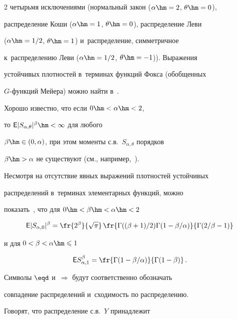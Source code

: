 \begin{multicols}{2}
четырьмя исключениями (нормальный закон ($\alpha\hm=2$, $\theta\hm=0$),


распределение Коши ($\alpha\hm=1$, $\theta\hm=0$), распределение Леви


($\alpha\hm=1/2$, $\theta\hm=1$) и~распределение, симметричное 


к~распределению Леви ($\alpha\hm=1/2$, $\theta\hm=-1$)). Выражения


устойчивых плотностей в~терминах функций Фокса (обобщенных


$G$-функ\-ций Мейера) можно найти в~\cite{Schneider1986, UchaikinZolotarev1999}.





Хорошо известно, что если $0\hm<\alpha\hm<2$, 


то ${\sf E}|S_{\alpha,\theta}|^{\beta}\hm<\infty$ для любого


$\beta\hm\in(0,\alpha)$, при этом моменты с.в.~$S_{\alpha,\theta}$ порядков


$\beta\hm>\alpha$ не существуют (см., например,~\cite{Zolotarev1983}).


Несмотря на отсутствие явных выражений плотностей устойчивых


распределений в~терминах элементарных функций, можно 


показать~\cite{KorolevWeibull2016}, что для $0\hm<\beta\hm<\alpha\hm<2$


$$


{\sf E}|S_{\alpha,0}|^{\beta}=\fr{2^{\beta}}{\sqrt{\pi}}\,


\fr{\Gamma(({\beta+1})/{2})\Gamma(1-{\beta}/{\alpha})}


{\Gamma({2}/{\beta}-1)}


$$


и для $0<\beta<\alpha\hm\leqslant 1$


$$


{\sf


E}S_{\alpha,1}^{\beta}=\fr{\Gamma(1-{\beta}/{\alpha})}{\Gamma(1-\beta)}\,.


$$





Символы $\eqd$ и~$\Longrightarrow$ будут соответственно обозначать


совпадение распределений и~сходимость по распределению.





Говорят, что распределение с.в.~$Y$ принадлежит 



\end{multicols}
